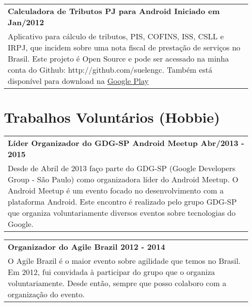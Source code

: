 \documentclass[a4paper, oneside, final]{scrartcl}
\newcommand{\vspc}{\vspace{0.15cm}} %
\begin{document}
\begin{center}
\begin{tabularx}{1\linewidth}{X}
{\bf Calculadora de Tributos PJ para Android \hfill Iniciado em Jan/2012} \\
Aplicativo para cálculo de tributos, PIS, COFINS, ISS, CSLL e IRPJ, que incidem sobre uma nota fiscal de prestação de serviços no Brasil. Este projeto é Open Source e pode ser acessado na minha conta do Github: http://github.com/suelengc. Também está disponível para download na {\href{https://play.google.com/store/apps/details?id=br.com.suelengc.calctributospj}{Google Play}} \vspc\\
\end{tabularx}

\section{Trabalhos Voluntários (Hobbie)}
\begin{tabularx}{1\linewidth}{X}
{\bf Líder Organizador do GDG-SP Android Meetup \hfill Abr/2013 - 2015} \\
Desde de Abril de 2013 faço parte do GDG-SP (Google Developers Group - São Paulo) como organizadora líder do Android Meetup. O Android Meetup é um evento focado no desenvolvimento com a plataforma Android. Este encontro é realizado pelo grupo GDG-SP que organiza voluntariamente diversos eventos sobre tecnologias do Google. \vspc\\
\end{tabularx}

\begin{tabularx}{1\linewidth}{X}
{\bf Organizador do Agile Brazil \hfill 2012 - 2014} \\
O Agile Brazil é o maior evento sobre agilidade que temos no Brasil. Em 2012, fui convidada à participar do grupo que o organiza voluntariamente. Desde então, sempre que posso colaboro com a organização do evento. \vspc\\
\end{tabularx}


\end{center}
\end{document}

